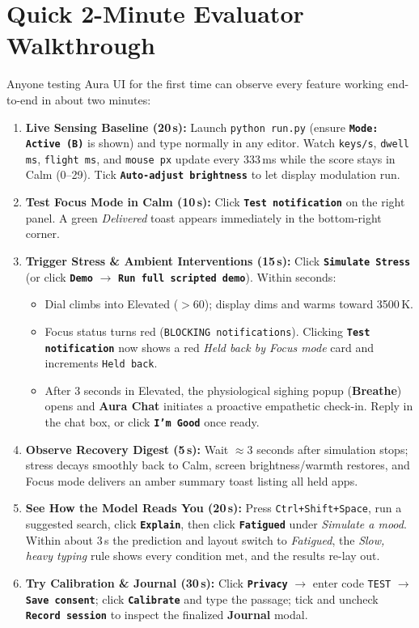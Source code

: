 \documentclass[11pt,a4paper]{article}
\newcommand{\uictrl}[1]{\texttt{\textbf{#1}}}
\begin{document}
\section{Quick 2-Minute Evaluator Walkthrough}

Anyone testing Aura UI for the first time can observe every feature working end-to-end in about two minutes:
\begin{enumerate}[leftmargin=1.5em, itemsep=3pt]
    \item \textbf{Live Sensing Baseline (20\,s):} Launch \texttt{python run.py} (ensure \uictrl{Mode: Active (B)} is shown) and type normally in any editor. Watch \texttt{keys/s}, \texttt{dwell ms}, \texttt{flight ms}, and \texttt{mouse px} update every 333\,ms while the score stays in \textcolor{AuraTeal}{Calm} (0--29). Tick \uictrl{Auto-adjust brightness} to let display modulation run.
    \item \textbf{Test Focus Mode in Calm (10\,s):} Click \uictrl{Test notification} on the right panel. A green \textit{Delivered} toast appears immediately in the bottom-right corner.
    \item \textbf{Trigger Stress \& Ambient Interventions (15\,s):} Click \uictrl{Simulate Stress} (or click \uictrl{Demo} $\rightarrow$ \uictrl{Run full scripted demo}). Within seconds:
    \begin{itemize}[leftmargin=1.2em, itemsep=1pt]
        \item Dial climbs into \textcolor{AuraRose}{Elevated} ($>60$); display dims and warms toward 3500\,K.
        \item Focus status turns red (\texttt{BLOCKING notifications}). Clicking \uictrl{Test notification} now shows a red \textit{Held back by Focus mode} card and increments \texttt{Held back}.
        \item After 3 seconds in Elevated, the physiological sighing popup (\textbf{Breathe}) opens and \textbf{Aura Chat} initiates a proactive empathetic check-in. Reply in the chat box, or click \uictrl{I'm Good} once ready.
    \end{itemize}
    \item \textbf{Observe Recovery Digest (5\,s):} Wait $\approx 3$ seconds after simulation stops; stress decays smoothly back to \textcolor{AuraTeal}{Calm}, screen brightness/warmth restores, and Focus mode delivers an amber summary toast listing all held apps.
    \item \textbf{See How the Model Reads You (20\,s):} Press \texttt{Ctrl+Shift+Space}, run a suggested search, click \uictrl{Explain}, then click \uictrl{Fatigued} under \textit{Simulate a mood}. Within about 3\,s the prediction and layout switch to \textit{Fatigued}, the \textit{Slow, heavy typing} rule shows every condition met, and the results re-lay out.
    \item \textbf{Try Calibration \& Journal (30\,s):} Click \uictrl{Privacy} $\rightarrow$ enter code \texttt{TEST} $\rightarrow$ \uictrl{Save consent}; click \uictrl{Calibrate} and type the passage; tick and uncheck \uictrl{Record session} to inspect the finalized \textbf{Journal} modal.
\end{enumerate}
\end{document}
